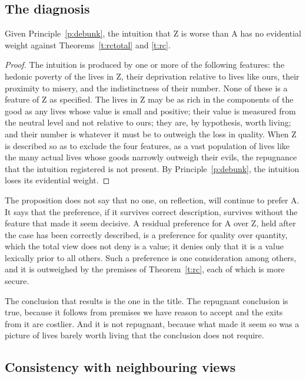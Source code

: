 \documentclass{situationist-preprint}
\begin{document}
\subsection{The diagnosis}

\begin{proposition}\label{p:diagnosis}
Given Principle~\ref{p:debunk}, the intuition that Z is worse than A has no evidential weight against Theorems~\ref{t:rctotal} and \ref{t:rc}.
\end{proposition}

\begin{proof}
The intuition is produced by one or more of the following features: the hedonic poverty of the lives in Z, their deprivation relative to lives like ours, their proximity to misery, and the indistinctness of their number. None of these is a feature of Z as specified. The lives in Z may be as rich in the components of the good as any lives whose value is small and positive; their value is measured from the neutral level and not relative to ours; they are, by hypothesis, worth living; and their number is whatever it must be to outweigh the loss in quality. When Z is described so as to exclude the four features, as a vast population of lives like the many actual lives whose goods narrowly outweigh their evils, the repugnance that the intuition registered is not present. By Principle~\ref{p:debunk}, the intuition loses its evidential weight.
\end{proof}

The proposition does not say that no one, on reflection, will continue to prefer A. It says that the preference, if it survives correct description, survives without the feature that made it seem decisive. A residual preference for A over Z, held after the case has been correctly described, is a preference for quality over quantity, which the total view does not deny is a value; it denies only that it is a value lexically prior to all others. Such a preference is one consideration among others, and it is outweighed by the premises of Theorem~\ref{t:rc}, each of which is more secure.

The conclusion that results is the one in the title. The repugnant conclusion is true, because it follows from premises we have reason to accept and the exits from it are costlier. And it is not repugnant, because what made it seem so was a picture of lives barely worth living that the conclusion does not require.

\subsection{Consistency with neighbouring views}
\end{document}
